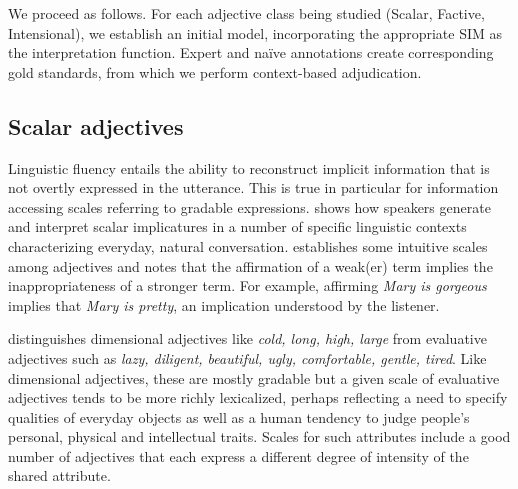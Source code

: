 \documentclass[10pt]{article}
\begin{document}
 
\noindent We proceed as follows. For each adjective class being studied (Scalar, Factive, Intensional), we establish an initial model, incorporating the appropriate SIM as the interpretation function. Expert and na\"ive annotations create corresponding gold standards, from which we perform context-based adjudication. 
 





\subsection{Scalar adjectives}

Linguistic fluency entails the ability to reconstruct implicit information that is not overtly expressed in the utterance. 
This is true in particular 
for information accessing scales referring to gradable expressions. 
\cite{hirschberg1991theory} shows how speakers generate and interpret scalar implicatures 
in a number of specific linguistic contexts characterizing everyday, natural conversation. 
\cite{horn2000pick} establishes some intuitive scales among adjectives and notes 
that the affirmation of a weak(er) term implies the inappropriateness of a stronger term. 
For example, affirming \textit{Mary is gorgeous} implies that \textit{Mary is pretty}, an implication 
understood by the listener. 

\cite{bierwisch1989semantics} distinguishes dimensional adjectives like \textit{cold, long, high, large} 
from evaluative adjectives such as \textit{lazy, diligent, beautiful, ugly, comfortable, 
gentle, tired}. Like dimensional adjectives, these are mostly gradable but a given scale 
of evaluative adjectives tends to be more richly lexicalized, perhaps reflecting a need to specify 
qualities of everyday objects as well as a human tendency to judge people's personal, physical and intellectual traits. 
Scales for such attributes include a good number of 
adjectives that each express a different degree of intensity of the shared attribute.
\end{document}
